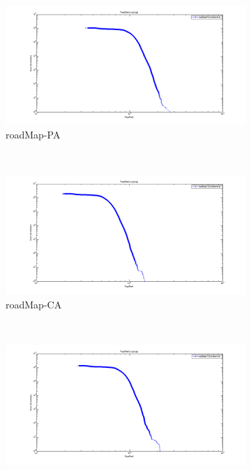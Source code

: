 \begin{figure} 
    \addtocounter{figure}{1}
    \centering 
        \begin{subfigure}[htbp]{0.9\textwidth}
                \includegraphics[width=\textwidth]{FIG/pr-pa.png}
                \caption{roadMap-PA}
                \label{fig:pr-pa}
        \end{subfigure}
        ~ %
        \begin{subfigure}[htbp]{0.9\textwidth}
                \includegraphics[width=\textwidth]{FIG/pr-ca.png}
                \caption{roadMap-CA}
                \label{fig:pr-ca}
        \end{subfigure}
        ~ %
        \begin{subfigure}[htbp]{0.9\textwidth}
                \includegraphics[width=\textwidth]{FIG/pr-tx.png}

\end{subfigure}
\end{figure}
